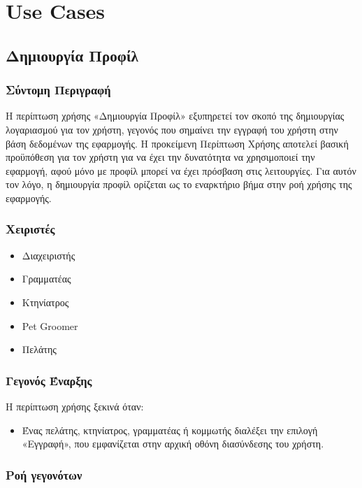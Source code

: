 \documentclass[12pt,a4paper,twoside]{book}
\begin{document}
\chapter{Use Cases}

\section{Δημιουργία Προφίλ}

\subsection{Σύντομη Περιγραφή}
Η περίπτωση χρήσης «Δημιουργία Προφίλ» εξυπηρετεί τον σκοπό της δημιουργίας λογαριασμού για τον χρήστη, γεγονός που σημαίνει την εγγραφή του χρήστη στην βάση δεδομένων της εφαρμογής. Η προκείμενη Περίπτωση Χρήσης αποτελεί βασική προϋπόθεση για τον χρήστη για να έχει την δυνατότητα να χρησιμοποιεί την εφαρμογή, αφού μόνο με προφίλ μπορεί να έχει πρόσβαση στις λειτουργίες. Για αυτόν τον λόγο, η δημιουργία προφίλ ορίζεται ως το εναρκτήριο βήμα στην ροή χρήσης της εφαρμογής. %

\subsection{Χειριστές}
\begin{itemize}
  \item Διαχειριστής
  \item Γραμματέας
  \item Κτηνίατρος
  \item Pet Groomer
  \item Πελάτης
\end{itemize}

\subsection{Γεγονός Έναρξης}
Η περίπτωση χρήσης ξεκινά όταν:
\begin{itemize}
  \item Ένας πελάτης, κτηνίατρος, γραμματέας ή κομμωτής διαλέξει την επιλογή «Εγγραφή», που εμφανίζεται στην αρχική οθόνη διασύνδεσης του χρήστη.  %
\end{itemize}

\subsection{Ροή γεγονότων}
\end{document}
